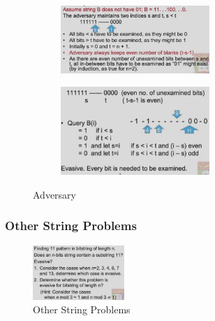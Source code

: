 \begin{figure}[H]
    \centering
    \begin{subfigure}{0.48\textwidth}
        \centering
        \includegraphics[width=0.618\textwidth]{pic/DAA5/Adversary1}
    \end{subfigure}
    \begin{subfigure}{0.48\textwidth}
        \centering
        \includegraphics[width=0.618\textwidth]{pic/DAA5/Adversary2}
    \end{subfigure}
    \caption{Adversary}
\end{figure}

\subsubsection{Other String Problems}
\begin{figure}[H]
    \centering
    \includegraphics[width=0.309\textwidth]{pic/DAA5/Other String Problems}
    \caption{Other String Problems}
\end{figure}
